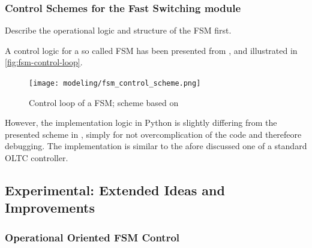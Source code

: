 \subsubsection{Control Schemes for the Fast Switching module}
Describe the operational logic and structure of the \acf{FSM} first.

A control logic for a so called \acs{FSM} has been presented from \textcite{burlakin_2024}, and illustrated in \autoref{fig:fsm-control-loop}.

\begin{figure}[htb!]
        \centering
        \texttt{[image: modeling/fsm\_control\_scheme.png]}
        \caption[Control loop of a \acf{FSM}]{Control loop of a \acs{FSM}; scheme based on \textcite{burlakin_2024}}
        \label{fig:fsm-control-loop}
\end{figure}

However, the implementation logic in Python is slightly differing from the presented scheme in \autocite{burlakin_2024}, simply for not overcomplication of the code and therefeore debugging. 
The implementation is similar to the afore discussed one of a standard \acs{OLTC} controller. 


\subsection{Experimental: Extended Ideas and Improvements}

\subsubsection{Operational Oriented FSM Control}

